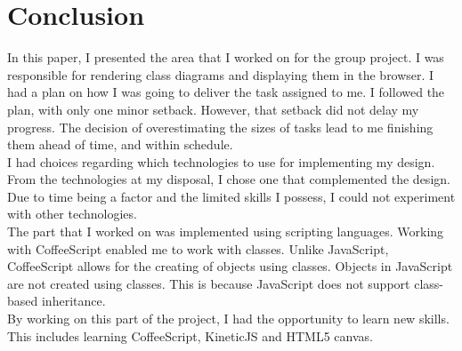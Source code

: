 \documentclass[a4paper,12pt]{article}
\begin{document}
\section{Conclusion}
In this paper, I presented the area that I worked on for the group project. I was responsible for rendering class diagrams and displaying them in the browser. I had a plan on how I was going to deliver the task assigned to me. I followed the plan, with only one minor setback. However, that setback did not delay my progress. The decision of overestimating the sizes of tasks lead to me finishing them ahead of time, and within schedule. \\

\indent I had choices regarding which technologies to use for implementing my design. From the technologies at my disposal, I chose one that complemented the design. Due to time being a factor and the limited skills I possess, I could not experiment with other technologies.\\

\indent The part that I worked on was implemented using scripting languages. Working with CoffeeScript enabled me to work with classes. Unlike JavaScript, CoffeeScript allows for the creating of objects using classes. Objects in JavaScript are not created using classes. This is because JavaScript does not support class-based inheritance.\\

\indent By working on this part of the project, I had the opportunity to learn new skills. This includes learning CoffeeScript, KineticJS and HTML5 canvas.

 
\end{document}
